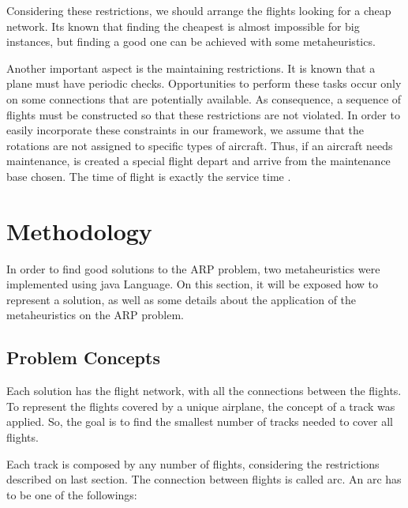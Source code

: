 \documentclass{endm}
\begin{document}
Considering these restrictions, we should arrange the flights looking for a cheap network. Its known that finding the cheapest is almost impossible for big instances, but finding a good one can be achieved with some metaheuristics.

	Another important aspect is the maintaining restrictions. It is known that a plane must have periodic checks. Opportunities to perform these tasks occur only on some connections that are potentially available. As consequence, a sequence of flights must be constructed so that these restrictions are not violated. In order to easily incorporate these constraints in our framework, we assume that the rotations are not assigned to specific types of aircraft. Thus, if an aircraft needs maintenance, is created a special flight depart and arrive from the maintenance base chosen. The time of flight is exactly the service time \cite{pimentel2005}.

\section{Methodology}

In order to find good solutions to the ARP problem, two metaheuristics were implemented using java Language. On this section, it will be exposed how to represent a solution, as well as some details about the application of the metaheuristics on the ARP problem.

\subsection{Problem Concepts}

Each solution has the flight network, with all the connections between the flights. To represent the flights covered by a unique airplane, the concept of a track was applied. So, the goal is to find the smallest number of tracks needed to cover all flights.

	Each track is composed by any number of flights, considering the restrictions described on last section. The connection between flights is called arc. An arc has to be one of the followings:
\end{document}
